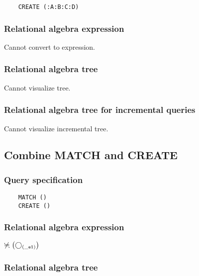 	\begin{lstlisting}
	CREATE (:A:B:C:D)
	\end{lstlisting}


	\subsubsection*{Relational algebra expression}

	Cannot convert to expression.

	\subsubsection*{Relational algebra tree}

	Cannot visualize tree.

	\subsubsection*{Relational algebra tree for incremental queries}

	Cannot visualize incremental tree.
	\subsection{Combine MATCH and CREATE}

	\subsubsection*{Query specification}

	\begin{lstlisting}
	MATCH ()
	CREATE ()
	\end{lstlisting}


	\subsubsection*{Relational algebra expression}

	$\alldifferent{} \left(\getvertices{\_e1}{}\right)$

	\subsubsection*{Relational algebra tree}


